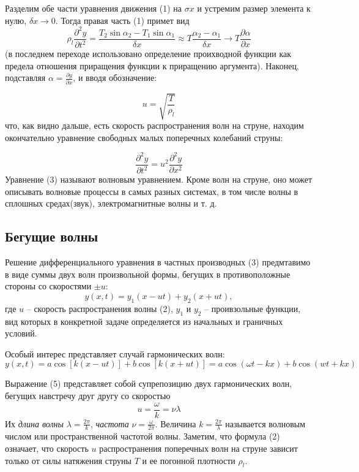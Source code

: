 \documentclass[a4paper,12pt]{article} %
\begin{document}
Разделим обе части уравнения движения (1) на $\sigma x$ и устремим размер элемента к нулю, $\delta x \rightarrow 0$. Тогда правая часть (1) примет вид 
\[\rho_l\frac{\partial^2 y}{\partial t^2} = \frac{T_2\sin\alpha_2-T_1\sin\alpha_1}{\delta x}\approx T\frac{\alpha_2 - \alpha_1}{\delta x} \rightarrow T\frac{\partial\alpha}{\partial x}\]
(в последнем переходе использовано определение проихводной функции как предела отношения приращения функции к приращению аргумента). Наконец, подставляя $\alpha = \frac{\partial y}{\partial x}$, и вводя обозначение:

\begin{equation}
u = \sqrt{\frac{T}{\rho_l}}
\end{equation}
что, как видно дальше, есть скорость распространения волн на струне, находим окончательно уравнение свободных малых поперечных колебаний струны:

\begin{equation}
\frac{\partial^2 y}{\partial t^2} = u^2\frac{\partial^2 y}{\partial x^2}
\end{equation}
Уравнение (3) называют волновым уравнением. Кроме волн на струне, оно может описывать волновые процессы в самых разных системах, в том числе волны в сплошных средах(звук), электромагнитные волны и т. д.
\subsection{Бегущие волны}
Решение дифференциального уравнения в частных производных (3) предмтавимо в виде суммы двух волн произвольной формы, бегущих в противоположные стороны со скоростями $\pm u$:
\begin{equation}
y(x, t) = y_1(x-ut)+y_2(x+ut),
\end{equation}
где $u$ -- скорость распространения волны (2), $y_1$ и $y_2$ -- проивзольные функции, вид которых в конкретной задаче определяется из начальных и граничных условий.

Особый интерес представляет случай гармонических волн:
\begin{equation}
y(x, t) = a\cos[k(x-ut)] + b\cos[k(x+ut)] = a\cos(\omega t-kx)+b\cos(wt+kx)
\end{equation}

Выражение (5) представляет собой супрепозицию двух гармонических волн, бегущих навстречу друг другу со скоростью
\begin{equation}
u = \frac{\omega}{k}=\nu\lambda
\end{equation}
Их \textit{длина волны} $\lambda = \frac{2\pi}{k}$, \textit{частота} $\nu = \frac{\omega}{2\pi}$. Величина $k = \frac{2\pi}{\lambda}$ называется волновым числом или пространственной частотой волны.
Заметим, что формула (2) означает, что скорость $u$ распространения поперечных волн на струне зависит только от силы натяжения струны $T$ и ее погонной плотности $\rho_l$.
\end{document}

